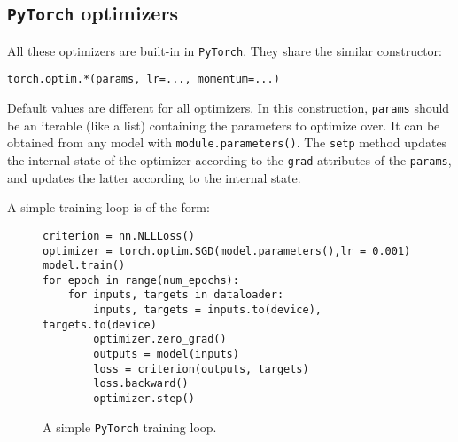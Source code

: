 \subsection{\texttt{PyTorch} optimizers}
All these optimizers are built-in in \texttt{PyTorch}. They share the similar constructor:
\begin{center}
    \texttt{torch.optim.*(params, lr=..., momentum=...)}
\end{center}
Default values are different for all optimizers. In this construction, \texttt{params} should be an iterable (like a list) containing the parameters to optimize over. It can be obtained from any model with \texttt{module.parameters()}. The \texttt{setp} method updates the internal state of the optimizer according to the \texttt{grad} attributes of the \texttt{params}, and updates the latter according to the internal state.

A simple training loop is of the form:
\begin{figure}[H]
    \centering
    \begin{minipage}[t]{.7\textwidth}
        \begin{verbatim}
criterion = nn.NLLLoss()
optimizer = torch.optim.SGD(model.parameters(),lr = 0.001)
model.train()
for epoch in range(num_epochs):
    for inputs, targets in dataloader:
        inputs, targets = inputs.to(device), targets.to(device)
        optimizer.zero_grad()
        outputs = model(inputs)
        loss = criterion(outputs, targets)
        loss.backward()
        optimizer.step()
        \end{verbatim}
        \caption{A simple \texttt{PyTorch} training loop.}
    \end{minipage}
\end{figure}
